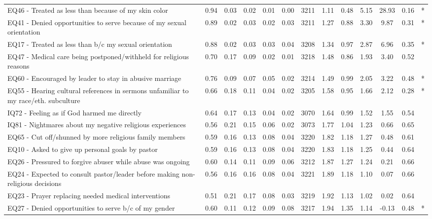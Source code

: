 \documentclass[
]{article}
\begin{document}
\begin{longtable}[t]{>{\raggedright\arraybackslash}p{2cm}cccccccccccc}
\endfoot
\bottomrule
\endlastfoot
EQ46 - Treated as less than because of my skin color & 0.94 & 0.03 & 0.02 & 0.01 & 0.00 & 3211 & 1.11 & 0.48 & 5.15 & 28.93 & 0.16 & *\\
EQ41 - Denied opportunities to serve because of my sexual orientation & 0.89 & 0.02 & 0.03 & 0.02 & 0.03 & 3211 & 1.27 & 0.88 & 3.30 & 9.87 & 0.31 & *\\
EQ17 - Treated as less than b/c my sexual orientation & 0.88 & 0.02 & 0.03 & 0.03 & 0.04 & 3208 & 1.34 & 0.97 & 2.87 & 6.96 & 0.35 & *\\
EQ47 - Medical care being postponed/withheld for religious reasons & 0.70 & 0.17 & 0.09 & 0.02 & 0.01 & 3218 & 1.48 & 0.86 & 1.93 & 3.40 & 0.52 & \\
EQ60 - Encouraged by leader to stay in abusive marriage & 0.76 & 0.09 & 0.07 & 0.05 & 0.02 & 3214 & 1.49 & 0.99 & 2.05 & 3.22 & 0.48 & *\\
\addlinespace
EQ55 - Hearing cultural references in sermons unfamiliar to my race/eth. subculture & 0.66 & 0.18 & 0.11 & 0.04 & 0.02 & 3205 & 1.58 & 0.95 & 1.66 & 2.12 & 0.28 & *\\
IQ72 - Feeling as if God harmed me directly & 0.64 & 0.17 & 0.13 & 0.04 & 0.02 & 3070 & 1.64 & 0.99 & 1.52 & 1.55 & 0.54 & \\
IQ81 - Nightmares about my negative religious experiences & 0.56 & 0.21 & 0.15 & 0.06 & 0.02 & 3073 & 1.77 & 1.04 & 1.23 & 0.66 & 0.65 & \\
EQ65 - Cut off/shunned by more religious family members & 0.59 & 0.16 & 0.13 & 0.08 & 0.04 & 3220 & 1.82 & 1.18 & 1.27 & 0.48 & 0.61 & \\
EQ10 - Asked to give up personal goals by pastor & 0.59 & 0.16 & 0.13 & 0.08 & 0.04 & 3220 & 1.83 & 1.18 & 1.25 & 0.44 & 0.64 & \\
\addlinespace
EQ26 - Pressured to forgive abuser while abuse was ongoing & 0.60 & 0.14 & 0.11 & 0.09 & 0.06 & 3212 & 1.87 & 1.27 & 1.24 & 0.21 & 0.66 & \\
EQ24 - Expected to consult pastor/leader before making non-religious decisions & 0.56 & 0.16 & 0.16 & 0.08 & 0.04 & 3221 & 1.89 & 1.18 & 1.10 & 0.07 & 0.66 & \\
EQ23 - Prayer replacing needed medical interventions & 0.51 & 0.21 & 0.17 & 0.08 & 0.03 & 3219 & 1.92 & 1.13 & 1.02 & 0.02 & 0.64 & \\
EQ27 - Denied opportunities to serve b/c of my gender & 0.60 & 0.11 & 0.12 & 0.09 & 0.08 & 3217 & 1.94 & 1.35 & 1.14 & -0.13 & 0.48 & *\\

\end{longtable}
\end{document}
